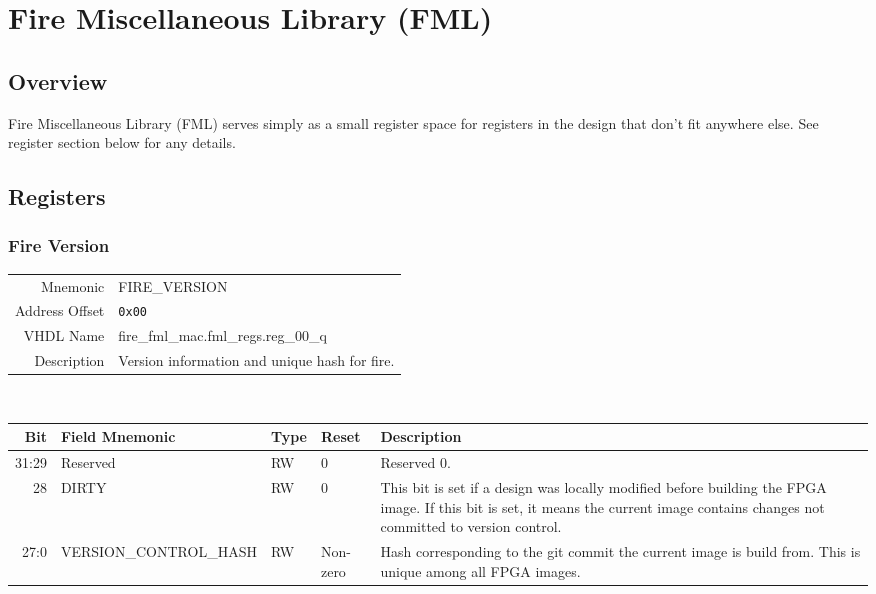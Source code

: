 \section{Fire Miscellaneous Library (FML)} \label{section_fml}

\subsection{Overview}
Fire Miscellaneous Library (FML) serves simply as a small register
space for registers in the design that don't fit anywhere else. See
register section below for any details.

\subsection{Registers}

\subsubsection{Fire Version}
\begin{tabular}{ r | p{350px} }
  Mnemonic       & FIRE\_VERSION                       \\
  Address Offset & \texttt{0x00}                       \\
  VHDL Name      & fire\_fml\_mac.fml\_regs.reg\_00\_q \\ \hline

  Description &
  Version information and unique hash for fire. \\
\end{tabular}
\\
\begin{tabularx}{\textwidth}{r|l|l|l|X}
  \hline
  Bit   & Field Mnemonic          & Type & Reset    & Description \\ \hline

  31:29 & Reserved                & RW   & 0        &

  Reserved 0. \\

  28    & DIRTY                   & RW   & 0        &

  This bit is set if a design was locally modified before building the
  FPGA image. If this bit is set, it means the current image contains
  changes not committed to version control. \\

  27:0  & VERSION\_CONTROL\_HASH  & RW   & Non-zero &

  Hash corresponding to the git commit the current image is build
  from. This is unique among all FPGA images. \\
\end{tabularx}

